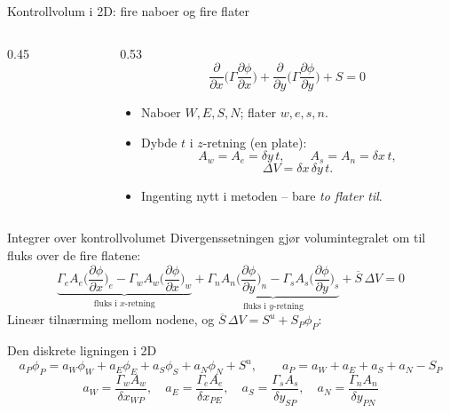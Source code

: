 \documentclass[11pt,aspectratio=169]{beamer}
\begin{document}
\begin{frame}{Kontrollvolum i 2D: fire naboer og fire flater}
\begin{columns}[c]
\begin{column}{0.45\textwidth}
\centering
{}
\end{column}
\begin{column}{0.53\textwidth}
\[
\frac{\partial}{\partial x}\Big(\Gamma\frac{\partial\phi}{\partial x}\Big) + \frac{\partial}{\partial y}\Big(\Gamma\frac{\partial\phi}{\partial y}\Big) + S = 0
\]
\begin{itemize}
\item Naboer $W, E, S, N$; flater $w, e, s, n$.
\item Dybde $t$ i $z$-retning (en plate):
\[
A_w = A_e = \delta y\,t, \qquad A_s = A_n = \delta x\,t,
\]
\[
\Delta V = \delta x\,\delta y\,t .
\]
\item Ingenting nytt i metoden -- bare \emph{to flater til}.
\end{itemize}
\end{column}
\end{columns}
\end{frame}

\begin{frame}{Integrer over kontrollvolumet}
Divergenssetningen gjør volumintegralet om til fluks over de fire flatene:
\[
\underbrace{\Gamma_eA_e\Big(\frac{\partial\phi}{\partial x}\Big)_e - \Gamma_wA_w\Big(\frac{\partial\phi}{\partial x}\Big)_w}_{\text{fluks i } x\text{-retning}}
+ \underbrace{\Gamma_nA_n\Big(\frac{\partial\phi}{\partial y}\Big)_n - \Gamma_sA_s\Big(\frac{\partial\phi}{\partial y}\Big)_s}_{\text{fluks i } y\text{-retning}}
+ \overline S\,\Delta V = 0
\]
Lineær tilnærming mellom nodene, og $\overline S\,\Delta V = S^u + S_P\phi_P$:
\begin{oppsumb}{Den diskrete ligningen i 2D}
\[
a_P\phi_P = a_W\phi_W + a_E\phi_E + a_S\phi_S + a_N\phi_N + S^u, \qquad a_P = a_W + a_E + a_S + a_N - S_P
\]
\[
a_W = \frac{\Gamma_wA_w}{\delta x_{WP}}, \quad a_E = \frac{\Gamma_eA_e}{\delta x_{PE}}, \quad a_S = \frac{\Gamma_sA_s}{\delta y_{SP}}, \quad a_N = \frac{\Gamma_nA_n}{\delta y_{PN}}
\]
\end{oppsumb}
\end{frame}
\end{document}
